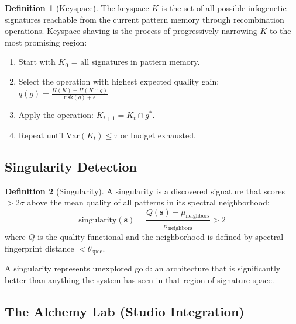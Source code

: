 \documentclass[11pt,a4paper,twoside]{article}
\theoremstyle{definition}
\newtheorem{definition}{Definition}[section]
\theoremstyle{plain}
\theoremstyle{remark}
\begin{document}
\begin{definition}[Keyspace]\label{def:keyspace}
The keyspace $K$ is the set of all possible infogenetic signatures
reachable from the current pattern memory through recombination
operations. Keyspace shaving is the process of progressively
narrowing $K$ to the most promising region:

\begin{enumerate}[nosep]
  \item Start with $K_0$ = all signatures in pattern memory.
  \item Select the operation with highest expected quality gain:
        $q(g) = \frac{H(K) - H(K \cap g)}{\mathrm{risk}(g) + \varepsilon}$
  \item Apply the operation: $K_{t+1} = K_t \cap g^*$.
  \item Repeat until $\mathrm{Var}(K_t) \le \tau$ or budget exhausted.
\end{enumerate}
\end{definition}

\subsection{Singularity Detection}\label{sec:al:singularity}

\begin{definition}[Singularity]\label{def:singularity}
A singularity is a discovered signature that scores $> 2\sigma$ above
the mean quality of all patterns in its spectral neighborhood:
\[
  \mathrm{singularity}(\mathbf{s}) =
  \frac{Q(\mathbf{s}) - \mu_{\mathrm{neighbors}}}
       {\sigma_{\mathrm{neighbors}}} > 2
\]
where $Q$ is the quality functional and the neighborhood is defined
by spectral fingerprint distance $< \theta_{\mathrm{spec}}$.

A singularity represents unexplored gold: an architecture that is
significantly better than anything the system has seen in that region
of signature space.
\end{definition}

\subsection{The Alchemy Lab (Studio Integration)}\label{sec:al:studio}
\end{document}
